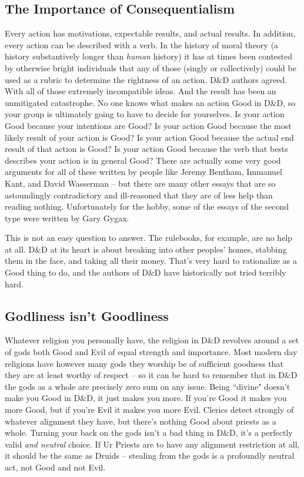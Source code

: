 \subsection{The Importance of Consequentialism}
Every action has motivations, expectable results, and actual results. In addition, every action can be described with a verb. In the history of moral theory (a history substantively longer than \textit{human} history) it has at times been contested by otherwise bright individuals that any of those (singly or collectively) could be used as a rubric to determine the rightness of an action. D\&D authors agreed. With all of those extremely incompatible ideas. And the result has been an unmitigated catastrophe. No one knows what makes an action Good in D\&D, so your group is ultimately going to have to decide for yourselves. Is your action Good because your intentions are Good? Is your action Good because the most likely result of your action is Good? Is your action Good because the actual end result of that action is Good? Is your action Good because the verb that bests describes your action is in general Good? There are actually some very good arguments for all of these written by people like Jeremy Bentham, Immanuel Kant, and David Wasserman -- but there are many other essays that are so astoundingly contradictory and ill-reasoned that they are of less help than reading nothing. Unfortunately for the hobby, some of the essays of the second type were written by Gary Gygax.

This is not an easy question to answer. The rulebooks, for example, are no help at all. D\&D at its heart is about breaking into other peoples' homes, stabbing them in the face, and taking all their money. That's very hard to rationalize as a Good thing to do, and the authors of D\&D have historically not tried terribly hard.

\subsection{Godliness isn't Goodliness}
Whatever religion you personally have, the religion in D\&D revolves around a set of gods both Good and Evil of equal strength and importance. Most modern day religions have however many gods they worship be of sufficient goodness that they are at least worthy of respect -- so it can be hard to remember that in D\&D the gods as a whole are precisely zero sum on any issue. Being ``divine" doesn't make you Good in D\&D, it just makes you more. If you're Good it makes you more Good, but if you're Evil it makes you more Evil. Clerics detect strongly of whatever alignment they have, but there's nothing Good about priests as a whole. Turning your back on the gods isn't a bad thing in D\&D, it's a perfectly valid \textit{and neutral} choice. If Ur Priests are to have any alignment restriction at all, it should be the same as Druids -- stealing from the gods is a profoundly neutral act, not Good and not Evil.

